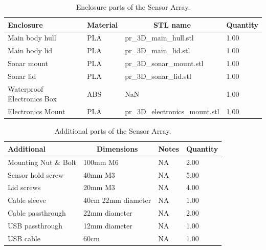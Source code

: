 \documentclass[
  english,
  man,floatsintext]{apa6}
\begin{document}
\begin{table}[H]

\begin{center}
\begin{threeparttable}

\caption{\label{tab:table2}Enclosure parts of the Sensor Array.}

\begin{tabular}{llll}
\toprule
Enclosure & \multicolumn{1}{c}{Material} & \multicolumn{1}{c}{STL name} & \multicolumn{1}{c}{Quantity}\\
\midrule
Main body hull & PLA & pr\_3D\_main\_hull.stl & 1.00\\
Main body lid & PLA & pr\_3D\_main\_lid.stl & 1.00\\
Sonar mount & PLA & pr\_3D\_sonar\_mount.stl & 1.00\\
Sonar lid & PLA & pr\_3D\_sonar\_lid.stl & 1.00\\
Waterproof Electronics Box & ABS & NaN & 1.00\\
Electronics Mount & PLA & pr\_3D\_electronics\_mount.stl & 1.00\\
\bottomrule
\end{tabular}

\end{threeparttable}
\end{center}

\end{table}

\begin{table}[H]

\begin{center}
\begin{threeparttable}

\caption{\label{tab:table3}Additional parts of the Sensor Array.}

\begin{tabular}{llll}
\toprule
Additional & \multicolumn{1}{c}{Dimensions} & \multicolumn{1}{c}{Notes} & \multicolumn{1}{c}{Quantity}\\
\midrule
Mounting Nut \& Bolt & 100mm M6 & NA & 2.00\\
Sensor hold screw & 40mm M3 & NA & 5.00\\
Lid screws & 20mm M3 & NA & 4.00\\
Cable sleeve & 40cm 22mm diameter & NA & 1.00\\
Cable passthrough & 22mm diameter & NA & 2.00\\
USB passthrough & 12mm diameter & NA & 1.00\\
USB cable & 60cm & NA & 1.00\\
\bottomrule
\end{tabular}

\end{threeparttable}
\end{center}

\end{table}
\end{document}
